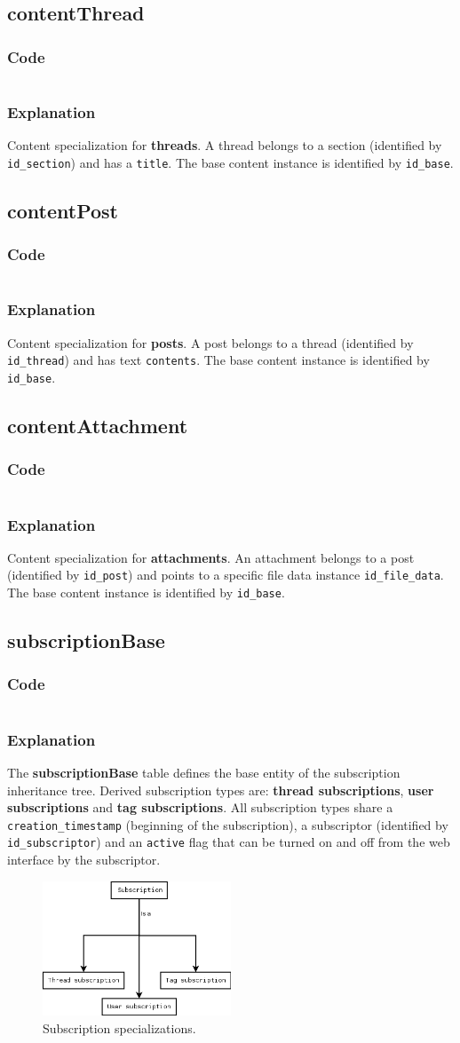 \documentclass[12pt]{report}
\renewcommand\emph{\textbf}
\newcommand{\printSQLtest}[1]
{
    \inputminted[linenos, breaklines, breakbytoken, tabsize=4, fontsize=\footnotesize]{mysql}{#1}
}
\newcommand{\printSQLTablepage}[2]
{
    \newpage
    \subsection{#2}
    \subsubsection{Code}
    \printSQLtest{../sql/parts/#1}
    \subsubsection{Explanation}
}
\begin{document}
                \printSQLTablepage{08_tblContentThread.sql}{contentThread}
                    Content specialization for \emph{threads}. A thread belongs to a section (identified by \texttt{id_section}) and has a \texttt{title}.
                    The base content instance is identified by \texttt{id_base}.


                \printSQLTablepage{09_tblContentPost.sql}{contentPost}
                    Content specialization for \emph{posts}. A post belongs to a thread (identified by \texttt{id_thread}) and has text \texttt{contents}.
                    The base content instance is identified by \texttt{id_base}.

                \printSQLTablepage{10_tblContentAttachment.sql}{contentAttachment}
                    Content specialization for \emph{attachments}. An attachment belongs to a post (identified by \texttt{id_post}) and points to a specific file data instance \texttt{id_file_data}.
                    The base content instance is identified by \texttt{id_base}.


                \printSQLTablepage{11_tblSubscriptionBase.sql}{subscriptionBase}
                    The \emph{subscriptionBase} table defines the base entity of the subscription inheritance tree. Derived subscription types are: \emph{thread subscriptions}, \emph{user subscriptions} and \emph{tag subscriptions}.
                    All subscription types share a \texttt{creation_timestamp} (beginning of the subscription), a subscriptor (identified by \texttt{id_subscriptor}) and an \texttt{active} flag that can be turned on and off from the web interface by the subscriptor.

                    \begin{figure}[h]
                    \caption{Subscription specializations.}
                    \centering
                    \includegraphics[width=0.5\textwidth]{td/11subscriptionbase}
                    \end{figure}
\end{document}
